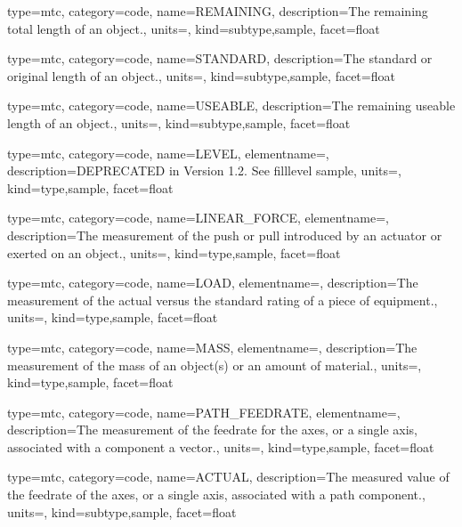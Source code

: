 {
  type=mtc,
  category=code,
  name={REMAINING},
  description={The remaining total length of an object.},
  units=,
  kind={subtype,sample},
  facet={\gls{float}}
}


{
  type=mtc,
  category=code,
  name={STANDARD},
  description={The standard or original length of an object.},
  units=,
  kind={subtype,sample},
  facet={\gls{float}}
}


{
  type=mtc,
  category=code,
  name={USEABLE},
  description={The remaining useable length of an object.},
  units=,
  kind={subtype,sample},
  facet={\gls{float}}
}


{
  type=mtc,
  category=code,
  name={LEVEL},
  elementname=,
  description={DEPRECATED in Version 1.2.  See \gls{filllevel sample}},
  units={},
  kind={type,sample},
  facet={\gls{float}}
}


{
  type=mtc,
  category=code,
  name={LINEAR\_FORCE},
  elementname=,
  description={The measurement of the push or pull introduced by an actuator or exerted on an object.},
  units=,
  kind={type,sample},
  facet={\gls{float}}
}


{
  type=mtc,
  category=code,
  name={LOAD},
  elementname=,
  description={The measurement of the actual versus the standard rating of a piece of equipment.},
  units=,
  kind={type,sample},
  facet={\gls{float}}
}


{
  type=mtc,
  category=code,
  name={MASS},
  elementname=,
  description={The measurement of the mass of an object(s) or an amount of material.},
  units=,
  kind={type,sample},
  facet={\gls{float}}
}


{
  type=mtc,
  category=code,
  name={PATH\_FEEDRATE},
  elementname=,
  description={The measurement of the feedrate for the axes, or a single axis, associated with a  component a vector.},
  units=,
  kind={type,sample},
  facet={\gls{float}}
}


{
  type=mtc,
  category=code,
  name={ACTUAL},
  description={The measured value of the feedrate of the axes, or a single axis, associated with a path component.},
  units=,
  kind={subtype,sample},
  facet={\gls{float}}
}


